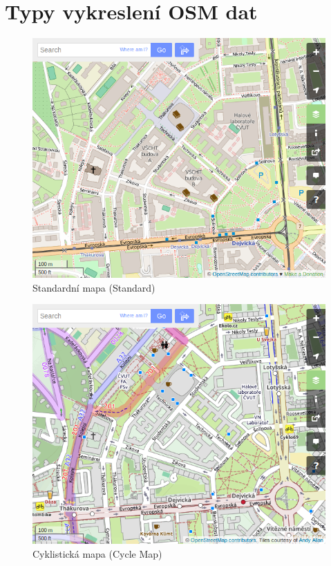 \chapter{Typy vykreslení OSM dat}
\label{vykresleni_dat}

\begin{figure}[H]
    \centering
    \includegraphics[width=11.5cm]{pictures/osm_standard.png} 
    \caption{Standardní mapa (Standard)}
    \label{fig:standard}
\end{figure}

\begin{figure}[H]
    \centering
    \includegraphics[width=11.5cm]{pictures/osm_cyclemap.png} 
    \caption{Cyklistická mapa (Cycle Map)}
    \label{fig:cycle}
\end{figure}

